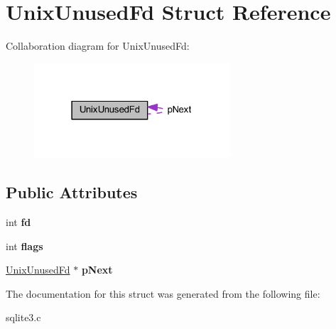 \hypertarget{struct_unix_unused_fd}{\section{Unix\-Unused\-Fd Struct Reference}
\label{struct_unix_unused_fd}
}


Collaboration diagram for Unix\-Unused\-Fd\-:\nopagebreak
\begin{figure}[H]
\begin{center}
\leavevmode
\includegraphics[width=207pt]{struct_unix_unused_fd__coll__graph}
\end{center}
\end{figure}
\subsection*{Public Attributes}
\begin{DoxyCompactItemize}
\item 
\hypertarget{struct_unix_unused_fd_a3f1a6127218af971aeb7b131c9c1600d}{int {\bfseries fd}}\label{struct_unix_unused_fd_a3f1a6127218af971aeb7b131c9c1600d}

\item 
\hypertarget{struct_unix_unused_fd_a744cd118bd91ec2019108e8205708684}{int {\bfseries flags}}\label{struct_unix_unused_fd_a744cd118bd91ec2019108e8205708684}

\item 
\hypertarget{struct_unix_unused_fd_a6bbcba75beeabdd2df126638bc1d8bc0}{\hyperlink{struct_unix_unused_fd}{Unix\-Unused\-Fd} $\ast$ {\bfseries p\-Next}}\label{struct_unix_unused_fd_a6bbcba75beeabdd2df126638bc1d8bc0}

\end{DoxyCompactItemize}


The documentation for this struct was generated from the following file\-:\begin{DoxyCompactItemize}
\item 
sqlite3.\-c\end{DoxyCompactItemize}
